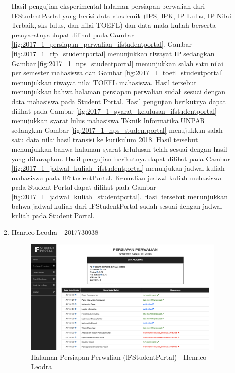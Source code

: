 \begin{itemize}
\begin{enumerate}
		Hasil pengujian eksperimental halaman persiapan perwalian dari IFStudentPortal yang berisi data akademik (IPS, IPK, IP Lulus, IP Nilai Terbaik, sks lulus, dan nilai TOEFL) dan data mata kuliah berserta prasyaratnya dapat dilihat pada Gambar \ref{fig:2017_1_persiapan_perwalian_ifstudentportal}. Gambar \ref{fig:2017_1_rip_studentportal} menunjukkan riwayat IP sedangkan Gambar \ref{fig:2017_1_nps_studentportal} menunjukkan salah satu nilai per semester mahasiswa dan Gambar \ref{fig:2017_1_toefl_studentportal} menunjukkan riwayat nilai TOEFL mahasiswa. Hasil tersebut menunjukkan bahwa halaman persiapan perwalian sudah sesuai dengan data mahasiswa pada Student Portal. Hasil pengujian berikutnya dapat dilihat pada Gambar \ref{fig:2017_1_syarat_kelulusan_ifstudentportal} menujukkan syarat lulus mahasiswa Teknik Informatika UNPAR sedangkan Gambar \ref{fig:2017_1_nps_studentportal} menujukkan salah satu data nilai hasil transisi ke kurikulum 2018. Hasil tersebut menunjukkan bahwa halaman syarat kelulusan telah sesuai dengan hasil yang diharapkan. Hasil pengujian berikutnya dapat dilihat pada Gambar \ref{fig:2017_1_jadwal_kuliah_ifstudentportal} menunjukan jadwal kuliah mahasiswa pada IFStudentPortal. Kemudian jadwal kuliah mahasiswa pada Student Portal dapat dilihat pada Gambar \ref{fig:2017_1_jadwal_kuliah_studentportal}. Hasil tersebut menunjukkan bahwa jadwal kuliah dari IFStudentPortal sudah sesuai dengan jadwal kuliah pada Student Portal.
		\item Henrico Leodra - 2017730038
		\begin{figure}[H]
			\centering
			\includegraphics[scale=0.325]{Gambar/HasilPengujian/2017_2_persiapan_perwalian_ifstudentportal}
			\caption{Halaman Persiapan Perwalian (IFStudentPortal) - Henrico Leodra}
			\label{fig:2017_2_persiapan_perwalian_ifstudentportal}
		\end{figure}

\end{enumerate}
\end{itemize}
